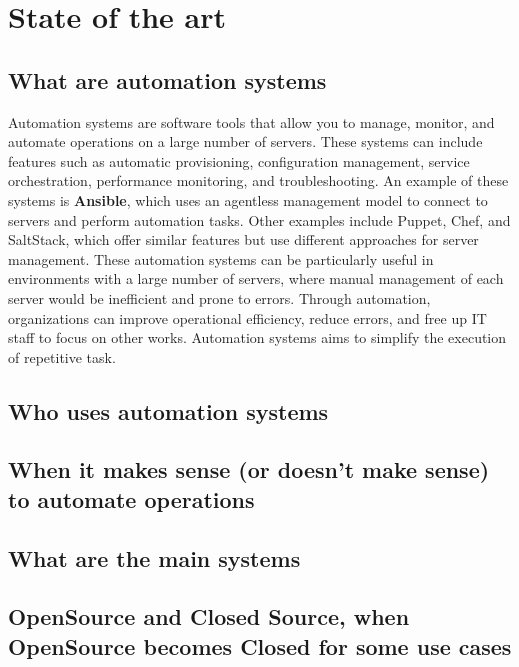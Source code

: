 \chapter{State of the art}

\section{What are automation systems}
Automation systems are software tools that allow you to manage, monitor, and automate operations on a large number of servers. These systems can include features such as automatic provisioning, configuration management, service orchestration, performance monitoring, and troubleshooting.
An example of these systems is \textbf{Ansible}, which uses an agentless management model to connect to servers and perform automation tasks. Other examples include Puppet, Chef, and SaltStack, which offer similar features but use different approaches for server management.
These automation systems can be particularly useful in environments with a large number of servers, where manual management of each server would be inefficient and prone to errors. Through automation, organizations can improve operational efficiency, reduce errors, and free up IT staff to focus on other works.
Automation systems aims to simplify the execution of repetitive task.

\section{Who uses automation systems}

\section{When it makes sense (or doesn't make sense) to automate operations}

\section{What are the main systems}

\section{OpenSource and Closed Source, when OpenSource becomes Closed for some use cases}